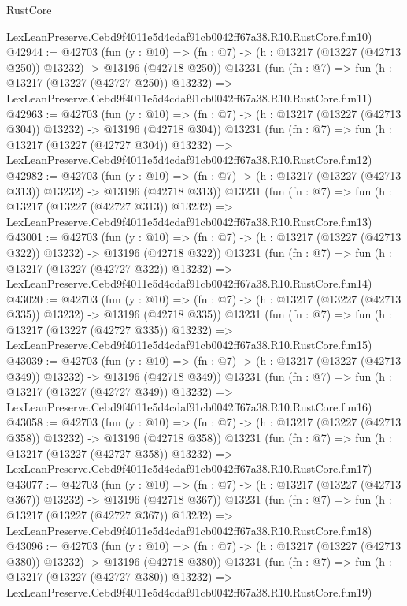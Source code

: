 \begin{lexlean}{RustCore}
\begin{coremodule}
    LexLeanPreserve.Cebd9f4011e5d4cdaf91cb0042ff67a38.R10.RustCore.fun10)
@42944 := @42703
    (fun (y : @10) =>
    (fn : @7) -> (h : @13217 (@13227 (@42713 @250)) @13232) -> @13196 (@42718 @250))
    @13231
    (fun (fn : @7) =>
    fun (h : @13217 (@13227 (@42727 @250)) @13232) =>
    LexLeanPreserve.Cebd9f4011e5d4cdaf91cb0042ff67a38.R10.RustCore.fun11)
@42963 := @42703
    (fun (y : @10) =>
    (fn : @7) -> (h : @13217 (@13227 (@42713 @304)) @13232) -> @13196 (@42718 @304))
    @13231
    (fun (fn : @7) =>
    fun (h : @13217 (@13227 (@42727 @304)) @13232) =>
    LexLeanPreserve.Cebd9f4011e5d4cdaf91cb0042ff67a38.R10.RustCore.fun12)
@42982 := @42703
    (fun (y : @10) =>
    (fn : @7) -> (h : @13217 (@13227 (@42713 @313)) @13232) -> @13196 (@42718 @313))
    @13231
    (fun (fn : @7) =>
    fun (h : @13217 (@13227 (@42727 @313)) @13232) =>
    LexLeanPreserve.Cebd9f4011e5d4cdaf91cb0042ff67a38.R10.RustCore.fun13)
@43001 := @42703
    (fun (y : @10) =>
    (fn : @7) -> (h : @13217 (@13227 (@42713 @322)) @13232) -> @13196 (@42718 @322))
    @13231
    (fun (fn : @7) =>
    fun (h : @13217 (@13227 (@42727 @322)) @13232) =>
    LexLeanPreserve.Cebd9f4011e5d4cdaf91cb0042ff67a38.R10.RustCore.fun14)
@43020 := @42703
    (fun (y : @10) =>
    (fn : @7) -> (h : @13217 (@13227 (@42713 @335)) @13232) -> @13196 (@42718 @335))
    @13231
    (fun (fn : @7) =>
    fun (h : @13217 (@13227 (@42727 @335)) @13232) =>
    LexLeanPreserve.Cebd9f4011e5d4cdaf91cb0042ff67a38.R10.RustCore.fun15)
@43039 := @42703
    (fun (y : @10) =>
    (fn : @7) -> (h : @13217 (@13227 (@42713 @349)) @13232) -> @13196 (@42718 @349))
    @13231
    (fun (fn : @7) =>
    fun (h : @13217 (@13227 (@42727 @349)) @13232) =>
    LexLeanPreserve.Cebd9f4011e5d4cdaf91cb0042ff67a38.R10.RustCore.fun16)
@43058 := @42703
    (fun (y : @10) =>
    (fn : @7) -> (h : @13217 (@13227 (@42713 @358)) @13232) -> @13196 (@42718 @358))
    @13231
    (fun (fn : @7) =>
    fun (h : @13217 (@13227 (@42727 @358)) @13232) =>
    LexLeanPreserve.Cebd9f4011e5d4cdaf91cb0042ff67a38.R10.RustCore.fun17)
@43077 := @42703
    (fun (y : @10) =>
    (fn : @7) -> (h : @13217 (@13227 (@42713 @367)) @13232) -> @13196 (@42718 @367))
    @13231
    (fun (fn : @7) =>
    fun (h : @13217 (@13227 (@42727 @367)) @13232) =>
    LexLeanPreserve.Cebd9f4011e5d4cdaf91cb0042ff67a38.R10.RustCore.fun18)
@43096 := @42703
    (fun (y : @10) =>
    (fn : @7) -> (h : @13217 (@13227 (@42713 @380)) @13232) -> @13196 (@42718 @380))
    @13231
    (fun (fn : @7) =>
    fun (h : @13217 (@13227 (@42727 @380)) @13232) =>
    LexLeanPreserve.Cebd9f4011e5d4cdaf91cb0042ff67a38.R10.RustCore.fun19)

\end{coremodule}
\end{lexlean}
